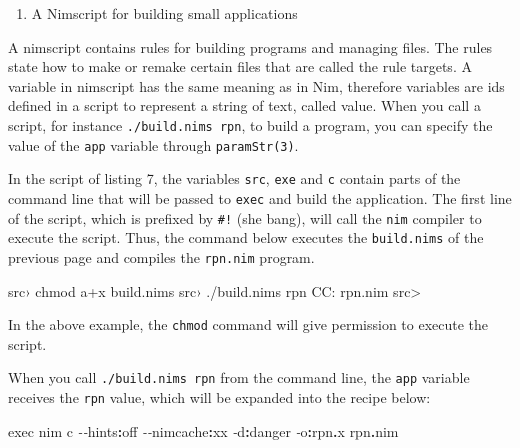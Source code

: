 \documentclass[
  12pt,
]{book}
\newenvironment{Shaded}{}{}
\newcommand{\CommentTok}[1]{\textcolor[rgb]{0.38,0.63,0.69}{\textit{#1}}}
\newcommand{\DataTypeTok}[1]{\textcolor[rgb]{0.56,0.13,0.00}{#1}}
\newcommand{\FloatTok}[1]{\textcolor[rgb]{0.25,0.63,0.44}{#1}}
\newcommand{\KeywordTok}[1]{\textcolor[rgb]{0.00,0.44,0.13}{\textbf{#1}}}
\newcommand{\NormalTok}[1]{#1}
\providecommand{\tightlist}{%
  \setlength{\itemsep}{0pt}\setlength{\parskip}{0pt}}
\begin{document}
\begin{enumerate}
\def\labelenumi{(\arabic{enumi})}
\setcounter{enumi}{6}
\tightlist
\item
  A Nimscript for building small applications
\end{enumerate}

A nimscript contains rules for building programs and managing files. The
rules state how to make or remake certain files that are called the rule
targets. A variable in nimscript has the same meaning as in Nim,
therefore variables are ids defined in a script to represent a string of
text, called value. When you call a script, for instance
\texttt{./build.nims\ rpn}, to build a program, you can specify the
value of the \texttt{app} variable through \texttt{paramStr(3)}.

In the script of listing 7, the variables \texttt{src}, \texttt{exe} and
\texttt{c} contain parts of the command line that will be passed to
\texttt{exec} and build the application. The first line of the script,
which is prefixed by \texttt{\#!} (she bang), will call the \texttt{nim}
compiler to execute the script. Thus, the command below executes the
\texttt{build.nims} of the previous page and compiles the
\texttt{rpn.nim} program.

\begin{Shaded}
\begin{Highlighting}[]
\NormalTok{src› chmod a+x build.nims}
\NormalTok{src› ./build.nims rpn}
\NormalTok{CC: rpn.nim}
\NormalTok{src\textgreater{} }
\end{Highlighting}
\end{Shaded}

In the above example, the \texttt{chmod} command will give permission to
execute the script.

When you call \texttt{./build.nims\ rpn} from the command line, the
\texttt{app} variable receives the \texttt{rpn} value, which will be
expanded into the recipe below:

\begin{Shaded}
\begin{Highlighting}[]
\DataTypeTok{exec} \DataTypeTok{nim}\NormalTok{ c }\CommentTok{{-}{-}}\NormalTok{hints}\KeywordTok{:}\FloatTok{off} \CommentTok{{-}{-}}\NormalTok{nimcache}\KeywordTok{:}\NormalTok{xx }\CommentTok{{-}}\NormalTok{d}\KeywordTok{:}\NormalTok{danger }\CommentTok{{-}}\NormalTok{o}\KeywordTok{:}\NormalTok{rpn}\KeywordTok{.}\DataTypeTok{x}\NormalTok{ rpn}\KeywordTok{.}\DataTypeTok{nim}
\end{Highlighting}
\end{Shaded}
\end{document}
